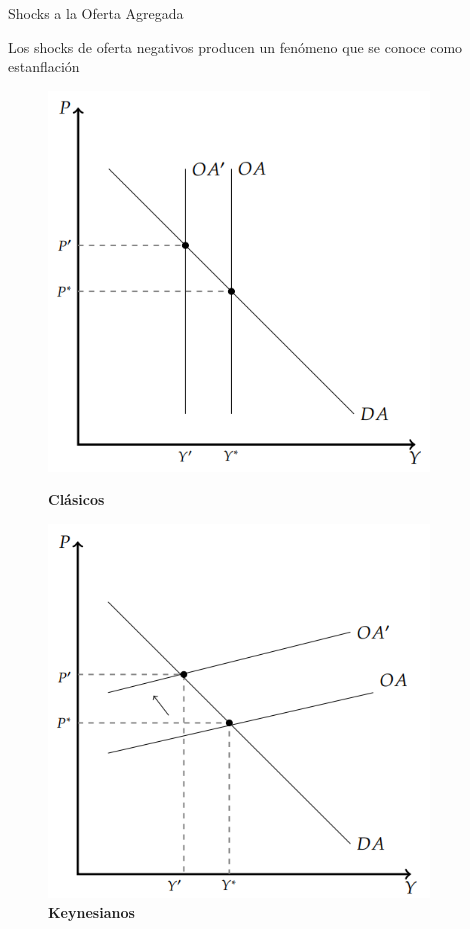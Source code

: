 \documentclass{beamer}
\begin{document}
\begin{frame}{Shocks a la Oferta Agregada}

Los shocks de oferta negativos  producen un fenómeno que se conoce como estanflación

    \begin{figure} [H]
        \centering
        \begin{minipage}{.5\textwidth}
        \centering
        \includegraphics[width=0.9\textwidth]{../Figures/C33.8.png}
        \caption{\textbf{Clásicos}}
        \end{minipage}%
        \begin{minipage}{.5\textwidth}
        \centering
        \includegraphics[width=0.9\textwidth]{../Figures/C33.9.png}
        \caption{\textbf{Keynesianos}}
        \end{minipage}
    \end{figure}
\end{frame}
\end{document}
